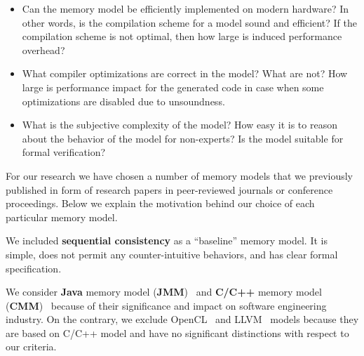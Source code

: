 \documentclass[a4paper,twoside,11pt]{article}
\numberwithin{equation}{section}
\begin{document}

\begin{itemize}
  
  \item Can the memory model be efficiently implemented on modern hardware? 
    In other words, is the compilation scheme for a model sound and efficient?
    If the compilation scheme is not optimal, then how large is induced performance overhead?

  \item What compiler optimizations are correct in the model? What are not? 
    How large is performance impact for the generated code in case when 
    some optimizations are disabled due to unsoundness.

  \item What is the subjective complexity of the model?
    How easy it is to reason about the behavior of the model for non-experts?
    Is the model suitable for formal verification?
  
\end{itemize}

For our research we have chosen a number of memory models 
that we previously published 
in form of research papers in peer-reviewed journals or conference proceedings. 
Below we explain the motivation behind our choice of each particular memory model.  




We included \textbf{sequential consistency} as a ``baseline'' memory model. 
It is simple, does not permit any counter-intuitive behaviors,
and has clear formal specification. 

We consider \textbf{Java} memory model (\textbf{JMM})~\cite{Manson-al:POPL05}
and \textbf{C/C++} memory model (\textbf{CMM})~\cite{Boehm-Adve:PLDI08, Batty-al:POPL11}
because of their significance and impact on software engineering industry.
On the contrary, we exclude OpenCL~\cite{Batty-el:POPL16}
and LLVM~\cite{Chakraborty-Vafeiadis:CGO17}
models because they are based on C/C++ model and have no significant distinctions
with respect to our criteria.
\end{document}
